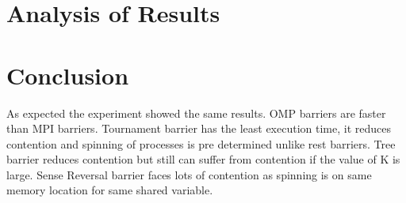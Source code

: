 \documentclass[11pt,pdftex,twocolumn]{article}
\begin{document}
\section{Analysis of Results}
\label{sec:analysis}
\lipsum[1]

\section{Conclusion}
As expected the experiment showed the same results. OMP barriers are faster than MPI barriers. Tournament barrier has the least execution time, it reduces contention and spinning of processes is pre determined unlike rest barriers. Tree barrier reduces contention but still can suffer from contention if the value of K is large. Sense Reversal barrier faces lots of contention as spinning is on same memory location for same shared variable.
\end{document}
